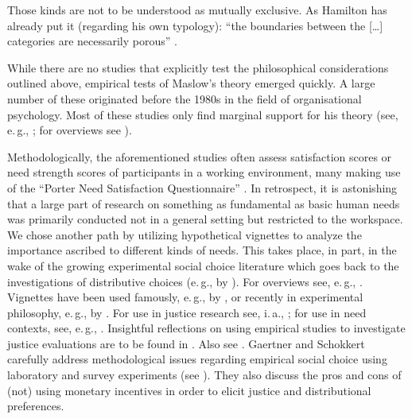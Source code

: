 \documentclass[10pt,letterpaper]{article}
\begin{document}
Those kinds are not to be understood as mutually exclusive.
As Hamilton has already put it (regarding his own typology): ``the boundaries between the [\ldots] categories are necessarily porous'' \cite[p. 23]{hamilton_political_2003}.

While there are no studies that explicitly test the philosophical considerations outlined above, empirical tests of Maslow's theory emerged quickly.
A large number of these originated before the 1980s in the field of organisational psychology.
Most of these studies only find marginal support for his theory (see, e.\,g., \cite{hall_examination_1968,payne_factor_1970,roberts_factor_1971,lawler_causal_1972,herman_managerial_1973,waters_factor_1973}; for overviews see \cite{wahba_maslow_1976,mitchell_measurement_1976}).

Methodologically, the aforementioned studies often assess satisfaction scores or need strength scores of participants in a working environment, many making use of the ``Porter Need Satisfaction Questionnaire'' \cite{porter_study_1961}.
In retrospect, it is astonishing that a large part of research on something as fundamental as basic human needs was primarily conducted not in a general setting but restricted to the workspace.
We chose another path by utilizing hypothetical vignettes to analyze the importance ascribed to different kinds of needs.
This takes place, in part, in the wake of the growing experimental social choice literature which goes back to the investigations of distributive choices (e.\,g., by \cite{yaari_dividing_1984,frohlich_choices_1987}).
For overviews see, e.\,g., \cite{konow_which_2003,traub_friedman_2005,konow_is_2009,gaertner_empirical_2012}.
Vignettes have been used famously, e.\,g., by \cite{dahl_does_1999,kahneman_prospect_1979}, or recently in experimental philosophy, e.\,g., by  \cite{knobe_intentional_2003_a,knobe_intentional_2003_b}.
For use in justice research see, i.\,a., \cite{kahneman_fairness_1986,blinder_shred_1990,levine_fairness_1993}; for use in need contexts, see, e.\,g., \cite{bauer_zur_2019}.
Insightful reflections on using empirical studies to investigate justice evaluations are to be found in \cite{miller_distributive_1992,elster_empirical_1995,levitt_what_2007}.
Also see \cite{bauer_philosophie_2019,bauer_empirical_2020}.
Gaertner and Schokkert carefully address methodological issues regarding empirical social choice using laboratory and survey experiments (see \cite{gaertner_empirical_2012}).
They also discuss the pros and cons of (not) using monetary incentives in order to elicit justice and distributional preferences.
\end{document}
